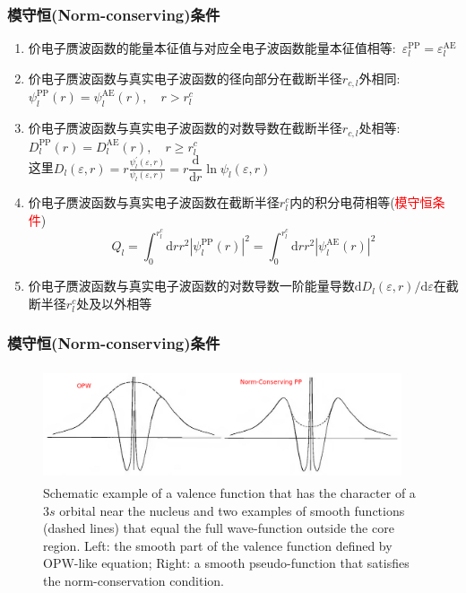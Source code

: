 \frame
{
	\frametitle{模守恒\textrm{(Norm-conserving)}条件}
	\begin{enumerate}
		\item 价电子赝波函数的能量本征值与对应全电子波函数能量本征值相等:~$\varepsilon_l^{\mathrm{PP}}=\varepsilon_l^{\mathrm{AE}}$
		\item 价电子赝波函数与真实电子波函数的径向部分在截断半径$r_{c,l}$外相同:~$\psi_l^{\mathrm{PP}}(r)=\psi_l^{\mathrm{AE}}(r),\quad r>r_{l}^c$
		\item 价电子赝波函数与真实电子波函数的对数导数在截断半径$r_{c,l}$处相等:~$D_l^{\mathrm{PP}}(r)=D_l^{\mathrm{AE}}(r),\quad r\geqslant r_{l}^c$\\
		这里$D_l(\varepsilon,r)=r\frac{\psi_l^{\prime}(\varepsilon,r)}{\psi_l(\varepsilon,r)}=r\dfrac{\mathrm{d}}{\mathrm{d}r}\ln\psi_l(\varepsilon,r)$
		\item 价电子赝波函数与真实电子波函数在截断半径$r_{l}^c$内的积分电荷相等(\textcolor{red}{模守恒条件})
			$$Q_l=\int_0^{r_{l}^c}\mathrm{d}rr^2|\psi_l^{\mathrm{PP}}(r)|^2=\int_0^{r_{l}^c}\mathrm{d}rr^2|\psi_l^{\mathrm{AE}}(r)|^2$$
		\item 价电子赝波函数与真实电子波函数的对数导数一阶能量导数$\mathrm{d}D_l(\varepsilon,r)/\mathrm{d}\varepsilon$在截断半径$r_{l}^c$处及以外相等
	\end{enumerate}
}

\frame
{
	\frametitle{模守恒\textrm{(Norm-conserving)}条件}
\begin{figure}[h!]
\centering
\vspace*{-0.10in}
\includegraphics[height=1.30in,width=4.17in,viewport=0 0 1150 350,clip]{Figures/Pseudo-OPW_NCPP.png}
\caption{\tiny \textrm{Schematic example of a valence function that has the character of a $3s$ orbital near the nucleus and two examples of smooth functions (dashed lines) that equal the full wave-function outside the core region. Left: the smooth part of the valence function defined by OPW-like equation; Right: a smooth pseudo-function that satisfies the norm-conservation condition.}}%
\label{Pseudo-OPW_NCPP}
\end{figure}
}

